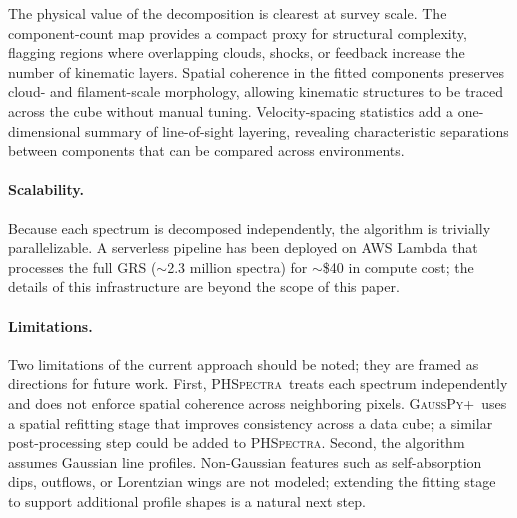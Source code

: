 \documentclass[twocolumn,twocolappendix,aj]{aastex631}
\newcommand{\phspectra}{\textsc{PHSpectra}}
\newcommand{\gausspyp}{\textsc{GaussPy+}}
\begin{document}
The physical value of the decomposition is clearest at survey scale.  The
component-count map provides a compact proxy for structural complexity,
flagging regions where overlapping clouds, shocks, or feedback increase the
number of kinematic layers.  Spatial coherence in the fitted components
preserves cloud- and filament-scale morphology, allowing kinematic structures
to be traced across the cube without manual tuning.  Velocity-spacing
statistics add a one-dimensional summary of line-of-sight layering, revealing
characteristic separations between components that can be compared across
environments.

\paragraph{Scalability.}
Because each spectrum is decomposed independently, the algorithm is
trivially parallelizable.  A serverless pipeline has been deployed on
AWS Lambda that processes the full GRS ($\sim$2.3 million spectra) for
$\sim$\$40 in compute cost; the details of this infrastructure are beyond
the scope of this paper.

\paragraph{Limitations.}
Two limitations of the current approach should be noted; they are framed as
directions for future work.  First, \phspectra\ treats each spectrum
independently and does not enforce spatial coherence across neighboring
pixels.  \gausspyp\ uses a spatial refitting stage \citep[Section~3.3
of][]{Riener2019} that improves consistency across a data cube; a similar
post-processing step could be added to \phspectra.  Second, the algorithm assumes
Gaussian line profiles.  Non-Gaussian features such as self-absorption dips,
outflows, or Lorentzian wings are not modeled; extending the fitting stage
to support additional profile shapes is a natural next step.
\end{document}
